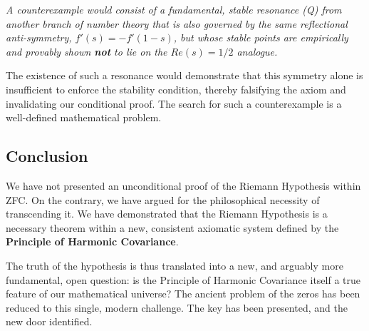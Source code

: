 \documentclass{article}
\theoremstyle{plain}
\theoremstyle{definition}
\theoremstyle{remark}
\begin{document}
\textit{A counterexample would consist of a fundamental, stable resonance (Q) from another branch of number theory that is also governed by the same reflectional anti-symmetry, $f'(s) = -f'(1-s)$, but whose stable points are empirically and provably shown \textbf{not} to lie on the $Re(s)=1/2$ analogue.}

The existence of such a resonance would demonstrate that this symmetry alone is insufficient to enforce the stability condition, thereby falsifying the axiom and invalidating our conditional proof. The search for such a counterexample is a well-defined mathematical problem.

\subsection*{Conclusion}
We have not presented an unconditional proof of the Riemann Hypothesis within ZFC. On the contrary, we have argued for the philosophical necessity of transcending it. We have demonstrated that the Riemann Hypothesis is a necessary theorem within a new, consistent axiomatic system defined by the \textbf{Principle of Harmonic Covariance}.

The truth of the hypothesis is thus translated into a new, and arguably more fundamental, open question: is the Principle of Harmonic Covariance itself a true feature of our mathematical universe? The ancient problem of the zeros has been reduced to this single, modern challenge. The key has been presented, and the new door identified.
\end{document}
